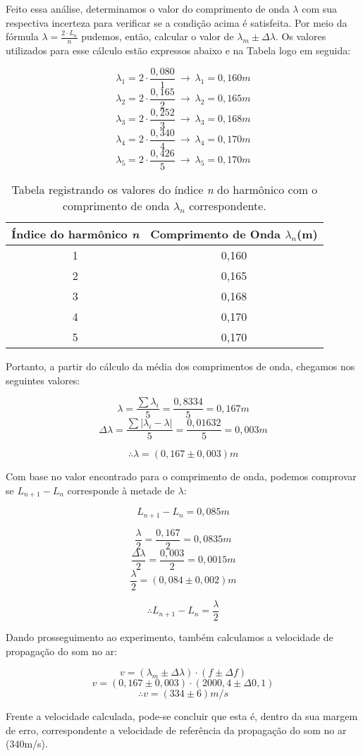 Feito essa análise, determinamos o valor do comprimento de onda $\lambda$ com sua respectiva incerteza para verificar se a condição acima é satisfeita. Por meio da fórmula $\lambda = \frac{2 \cdot L_n}{n}$  pudemos, então, calcular o valor de $\lambda_m \pm \Delta\lambda$. Os valores utilizados para esse cálculo estão expressos abaixo e na Tabela logo em seguida:

\[ \lambda_1 = 2 \cdot \frac{0,080}{1} \ \to \ \lambda _1 = 0,160 m  \]
\[ \lambda_2 = 2 \cdot \frac{0,165}{2} \ \to \ \lambda _2 = 0,165 m  \]
\[ \lambda_3 = 2 \cdot \frac{0,252}{3} \ \to \ \lambda _3 = 0,168 m  \]
\[ \lambda_4 = 2 \cdot \frac{0,340}{4} \ \to \ \lambda _4 = 0,170 m  \]
\[ \lambda_5 = 2 \cdot \frac{0,426}{5} \ \to \ \lambda _5 = 0,170 m  \]

\begin{table}[H]
    \centering
    \begin{tabular}{ |c||c| }
        \hline
        \textbf{Índice do harmônico \textit{n}} & \textbf{Comprimento de Onda \textit{$\lambda_n$}(m)}\\
        \hline 
         1&	0,160 \\
         
         2&	0,165 \\
         
         3&	0,168 \\
         
         4&	0,170 \\
         
         5&	0,170 \\
        \hline
    \end{tabular}
    \caption{Tabela registrando os valores do índice \textit{n} do harmônico com o comprimento de onda $\lambda_n$ correspondente.}
\end{table}

Portanto, a partir do cálculo da média dos comprimentos de onda, chegamos nos seguintes valores:

\[ \lambda = \frac{\sum \lambda_i}{5} = \frac{0,8334}{5} = 0,167 m\] 
\[ \Delta\lambda = \frac{\sum |\lambda_i - \lambda|}{5} = \frac{0,01632}{5} = 0,003 m\] 

\[ \therefore \lambda = (0,167 \pm 0,003)m\] 

Com base no valor encontrado para o comprimento de onda, podemos comprovar se $L_{n+1} - L_n$ corresponde à metade de $\lambda$:

\[ L_{n+1} - L_n = 0,085 m\]

\[ \frac{\lambda}{2} = \frac{0,167}{2} = 0,0835 m\]
\[ \frac{\Delta\lambda}{2} = \frac{0,003}{2} = 0,0015 m\]
\[ \frac{\lambda}{2} = (0,084 \pm 0,002) m\]

\[ \therefore L_{n+1} - L_n = \frac{\lambda}{2} \]

Dando prosseguimento ao experimento, também calculamos a velocidade de propagação do som no ar:

\[ v = (\lambda_m \pm \Delta\lambda) \cdot (f \pm \Delta f)\]
\[ v = (0,167 \pm 0,003) \cdot (2000,4 \pm \Delta 0,1)\]
\[ \therefore v = (334 \pm 6) m/s\]

Frente a velocidade calculada, pode-se concluir que esta é, dentro da sua margem de erro, correspondente a velocidade de referência da propagação do som no ar (340m/s).